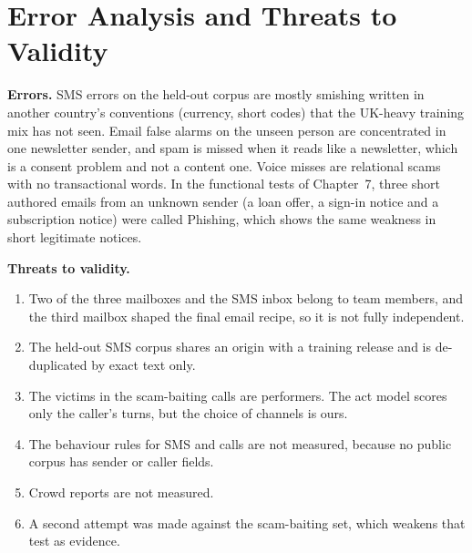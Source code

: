{\section{Error Analysis and Threats to Validity}
\textbf{Errors.} SMS errors on the held-out corpus are mostly smishing written in another country's conventions (currency, short codes) that the UK-heavy training mix has not seen. Email false alarms on the unseen person are concentrated in one newsletter sender, and spam is missed when it reads like a newsletter, which is a consent problem and not a content one. Voice misses are relational scams with no transactional words. In the functional tests of Chapter~7, three short authored emails from an unknown sender (a loan offer, a sign-in notice and a subscription notice) were called Phishing, which shows the same weakness in short legitimate notices.

\textbf{Threats to validity.}
\begin{enumerate}
\item Two of the three mailboxes and the SMS inbox belong to team members, and the third mailbox shaped the final email recipe, so it is not fully independent.
\item The held-out SMS corpus shares an origin with a training release and is de-duplicated by exact text only.
\item The victims in the scam-baiting calls are performers. The act model scores only the caller's turns, but the choice of channels is ours.
\item The behaviour rules for SMS and calls are not measured, because no public corpus has sender or caller fields.
\item Crowd reports are not measured.
\item A second attempt was made against the scam-baiting set, which weakens that test as evidence.
\end{enumerate}

}

